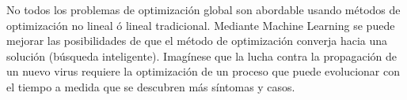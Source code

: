 
	No todos los problemas de optimización global son abordable usando métodos de optimización no lineal ó lineal tradicional. Mediante Machine Learning se puede mejorar las posibilidades de que el método de optimización converja hacia una solución (búsqueda inteligente). Imagínese que la lucha contra la propagación de un nuevo virus requiere la optimización de un proceso que puede evolucionar con el tiempo a medida que se descubren más síntomas y casos.


